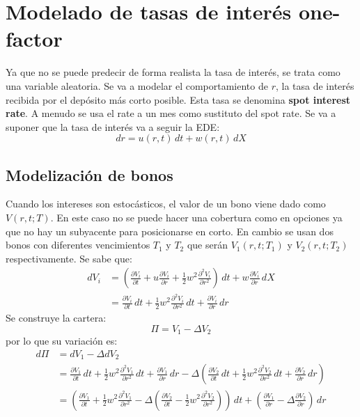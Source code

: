 \section{Modelado de tasas de interés one-factor}
Ya que no se puede predecir de forma realista la tasa de interés, se trata como una variable aleatoria. Se va a modelar el comportamiento de $r$, la tasa de interés recibida por el depósito más corto posible. Esta tasa se denomina \textbf{spot interest rate}. A menudo se usa el rate a un mes como sustituto del spot rate. Se va a suponer que la tasa de interés va a seguir la EDE:
\begin{equation*}
    dr = u(r,t)\,dt + w(r,t)\,dX
\end{equation*}


\subsection{Modelización de bonos}
Cuando los intereses son estocásticos, el valor de un bono viene dado como $V(r,t;T)$. En este caso no se puede hacer una cobertura como en opciones ya que no hay un subyacente para posicionarse en corto. En cambio se usan dos bonos con diferentes vencimientos $T_1$ y $T_2$ que serán $V_1(r,t;T_1)$ y $V_2(r,t;T_2)$ respectivamente. Se sabe que:
\begin{align*}
    dV_i &= \left( \frac{\partial V_i}{\partial t} + u \frac{\partial V_i}{\partial r} + \frac{1}{2} w^2 \frac{\partial^2 V_i}{\partial r^2} \right)\,dt + w \frac{\partial V_i}{\partial r}\,dX \\
    &= \frac{\partial V_i}{\partial t}\,dt + \frac{1}{2} w^2 \frac{\partial^2 V_i}{\partial r^2}\,dt + \frac{\partial V_i}{\partial r}\,dr
\end{align*}
Se construye la cartera:
\begin{equation*}
    \Pi = V_1 - \Delta V_2
\end{equation*}
por lo que su variación es:
\begin{align*}
    d\Pi &= dV_1 - \Delta dV_2 \\
    &= \frac{\partial V_1}{\partial t}\,dt + \frac{1}{2} w^2 \frac{\partial^2 V_1}{\partial r^2}\,dt + \frac{\partial V_1}{\partial r}\,dr - \Delta \left( \frac{\partial V_2}{\partial t}\,dt + \frac{1}{2} w^2 \frac{\partial^2 V_2}{\partial r^2}\,dt + \frac{\partial V_2}{\partial r}\,dr \right) \\
    &= \left( \frac{\partial V_1}{\partial t} + \frac{1}{2} w^2 \frac{\partial^2 V_1}{\partial r^2} - \Delta \left( \frac{\partial V_2}{\partial t} - \frac{1}{2} w^2 \frac{\partial^2 V_2}{\partial r^2} \right) \right)\,dt + \left( \frac{\partial V_1}{\partial r} - \Delta \frac{\partial V_2}{\partial r} \right)\,dr
\end{align*}
